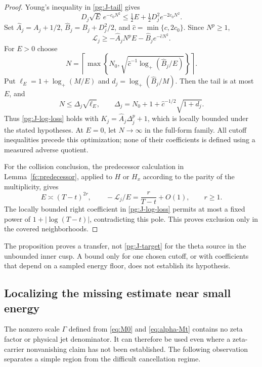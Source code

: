 \documentclass[11pt]{article}
\numberwithin{equation}{section}
\theoremstyle{definition}
\theoremstyle{remark}
\newcommand{\Lag}{\mathcal L}
\begin{document}
\begin{proof}
Young's inequality in \eqref{pg:J-tail} gives
\[
 D_j\sqrt E\,e^{-c_0N^2}
 \le\tfrac12E+\tfrac12D_j^2e^{-2c_0N^2}.
\]
Set $\widehat A_j=A_j+1/2$, $\widehat B_j=B_j+D_j^2/2$, and
$\widehat c=\min\{c,2c_0\}$.  Since $N^p\ge1$,
\[
 \Lag_j\ge-\widehat A_jN^pE-\widehat B_je^{-\widehat cN^2}.
\]
For $E>0$ choose
\[
 N=\left\lceil\max\left\{N_0,
          \sqrt{\widehat c^{-1}\log_+(\widehat B_j/E)}
                           \right\}\right\rceil.
\]
Put $\ell_E=1+\log_+(M/E)$ and
$d_j=\log_+(\widehat B_j/M)$.  Then the tail is at most $E$, and
\[
 N\le\Delta_j\sqrt{\ell_E},\qquad
 \Delta_j=N_0+1+\widehat c^{-1/2}\sqrt{1+d_j}.
\]
Thus \eqref{pg:J-log-loss} holds with
$K_j=\widehat A_j\Delta_j^p+1$, which is locally bounded under the
stated hypotheses.  At $E=0$, let $N\to\infty$ in the full-form
family.  All cutoff inequalities precede this optimization; none of
their coefficients is defined using a measured adverse quotient.

For the collision conclusion, the predecessor calculation in
Lemma~\ref{fc:predecessor}, applied to $H$ or $H_x$ according to
the parity of the multiplicity, gives
\[
 E\asymp(T-t)^{2r},\qquad
 -\Lag_j/E=\frac{r}{T-t}+O(1),\qquad r\ge1.
\]
The locally bounded right coefficient in \eqref{pg:J-log-loss}
permits at most a fixed power of $1+|\log(T-t)|$, contradicting
this pole.  This proves exclusion only in the covered neighborhoods.
\end{proof}

The proposition proves a transfer, not \eqref{pg:J-target} for the
theta source in the unbounded inner cusp.  A bound only for one chosen
cutoff, or with coefficients that depend on a sampled energy floor,
does not establish its hypothesis.

\subsection{Localizing the missing estimate near small energy}

The nonzero scale $\Gamma$ defined from \eqref{eq:M0} and
\eqref{eq:alpha-Mt} contains no zeta factor or physical jet denominator.
It can therefore be used even where a zeta-carrier nonvanishing claim
has not been established.  The following observation separates a
simple region from the difficult cancellation regime.
\end{document}

